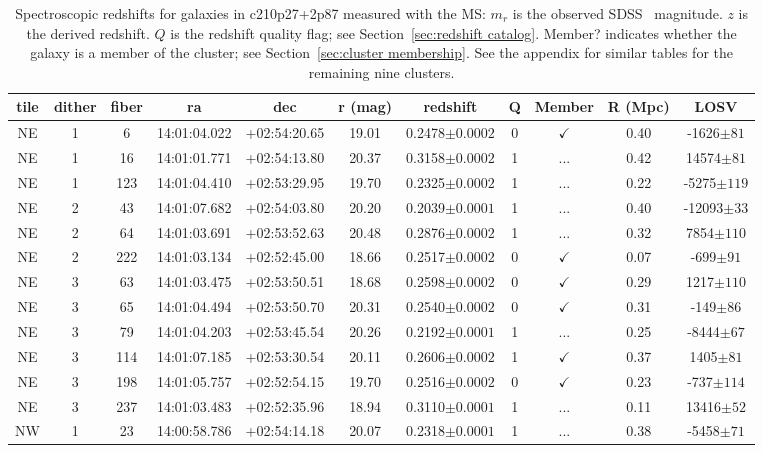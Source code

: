 \begin{table*}
	\centering \caption{Spectroscopic redshifts for galaxies in c210p27+2p87 measured with the MS: $m_r$ is the observed SDSS \sdssr\ magnitude. $z$ is the derived redshift. $Q$ is the redshift quality flag; see Section~\ref{sec:redshift catalog}. Member? indicates whether the galaxy is a member of the cluster; see Section~\ref{sec:cluster membership}. See the appendix for similar tables for the remaining nine clusters.}
	\begin{tabular}{ccccccccccc}
		\hline
		tile & dither & fiber & ra & dec & r (mag) & redshift & Q & Member & R (Mpc) & LOSV \\
		\hline \hline
NE & 1 & 6 & 14:01:04.022 & +02:54:20.65 & 19.01 & 0.2478$\pm{0.0002}$ & 0 & $\checkmark$ & 0.40 & -1626$\pm{81}$ \\
NE & 1 & 16 & 14:01:01.771 & +02:54:13.80 & 20.37 & 0.3158$\pm{0.0002}$ & 1 & ... & 0.42 & 14574$\pm{81}$ \\
NE & 1 & 123 & 14:01:04.410 & +02:53:29.95 & 19.70 & 0.2325$\pm{0.0002}$ & 1 & ... & 0.22 & -5275$\pm{119}$ \\
NE & 2 & 43 & 14:01:07.682 & +02:54:03.80 & 20.20 & 0.2039$\pm{0.0001}$ & 1 & ... & 0.40 & -12093$\pm{33}$ \\
NE & 2 & 64 & 14:01:03.691 & +02:53:52.63 & 20.48 & 0.2876$\pm{0.0002}$ & 1 & ... & 0.32 & 7854$\pm{110}$ \\
NE & 2 & 222 & 14:01:03.134 & +02:52:45.00 & 18.66 & 0.2517$\pm{0.0002}$ & 0 & $\checkmark$ & 0.07 & -699$\pm{91}$ \\
NE & 3 & 63 & 14:01:03.475 & +02:53:50.51 & 18.68 & 0.2598$\pm{0.0002}$ & 0 & $\checkmark$ & 0.29 & 1217$\pm{110}$ \\
NE & 3 & 65 & 14:01:04.494 & +02:53:50.70 & 20.31 & 0.2540$\pm{0.0002}$ & 0 & $\checkmark$ & 0.31 & -149$\pm{86}$ \\
NE & 3 & 79 & 14:01:04.203 & +02:53:45.54 & 20.26 & 0.2192$\pm{0.0001}$ & 1 & ... & 0.25 & -8444$\pm{67}$ \\
NE & 3 & 114 & 14:01:07.185 & +02:53:30.54 & 20.11 & 0.2606$\pm{0.0002}$ & 1 & $\checkmark$ & 0.37 & 1405$\pm{81}$ \\
NE & 3 & 198 & 14:01:05.757 & +02:52:54.15 & 19.70 & 0.2516$\pm{0.0002}$ & 0 & $\checkmark$ & 0.23 & -737$\pm{114}$ \\
NE & 3 & 237 & 14:01:03.483 & +02:52:35.96 & 18.94 & 0.3110$\pm{0.0001}$ & 1 & ... & 0.11 & 13416$\pm{52}$ \\
NW & 1 & 23 & 14:00:58.786 & +02:54:14.18 & 20.07 & 0.2318$\pm{0.0001}$ & 1 & ... & 0.38 & -5458$\pm{71}$ \\

\end{tabular}
\end{table*}
